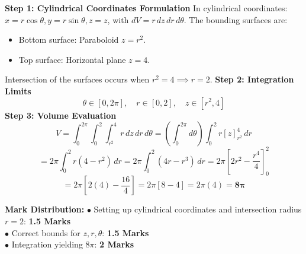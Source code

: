 \begin{solutionbox}
\textbf{Step 1: Cylindrical Coordinates Formulation}
In cylindrical coordinates: $x = r\cos\theta, y = r\sin\theta, z = z$, with $dV = r \, dz \, dr \, d\theta$.
The bounding surfaces are:
\begin{itemize}[leftmargin=6mm]
    \item Bottom surface: Paraboloid $z = r^2$.
    \item Top surface: Horizontal plane $z = 4$.
\end{itemize}
Intersection of the surfaces occurs when $r^2 = 4 \implies r = 2$.
\textbf{Step 2: Integration Limits}
\[
\theta \in [0, 2\pi], \quad r \in [0, 2], \quad z \in [r^2, 4]
\]
\textbf{Step 3: Volume Evaluation}
\[
V = \int_0^{2\pi} \int_0^2 \int_{r^2}^4 r \, dz \, dr \, d\theta = \left(\int_0^{2\pi} d\theta\right) \int_0^2 r [z]_{r^2}^4 \, dr
\]
\[
= 2\pi \int_0^2 r (4 - r^2) \, dr = 2\pi \int_0^2 (4r - r^3) \, dr = 2\pi \left[ 2r^2 - \frac{r^4}{4} \right]_0^2
\]
\[
= 2\pi \left[ 2(4) - \frac{16}{4} \right] = 2\pi [8 - 4] = 2\pi(4) = \mathbf{8\pi}
\]

\begin{markingrubric}
\textbf{Mark Distribution:}
$\bullet$ Setting up cylindrical coordinates and intersection radius $r = 2$: \textbf{1.5 Marks}\\
$\bullet$ Correct bounds for $z, r, \theta$: \textbf{1.5 Marks}\\
$\bullet$ Integration yielding $8\pi$: \textbf{2 Marks}
\end{markingrubric}
\end{solutionbox}

